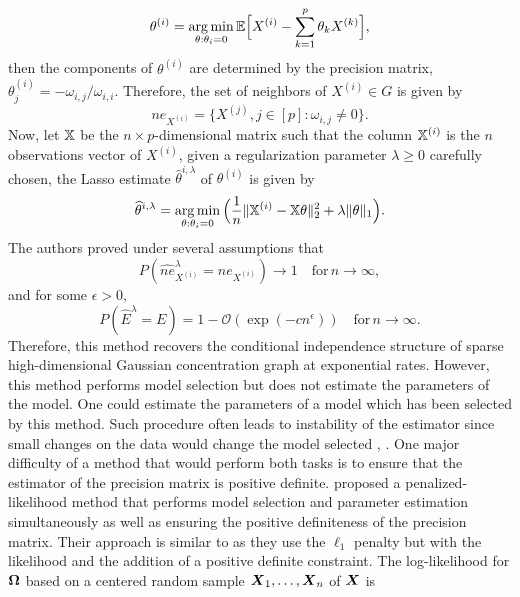 \begin{equation}
  \theta^{(i)} = \operatorname*{arg\,min}_{\theta:\theta_i=0}{\mathbb E}\Big[ X^{(i)}-\sum_{k=1}^p\theta_k X^{(k)}\Big],
\end{equation}
then the components of $\theta^{(i)}$ are determined by the precision matrix, $\theta^{(i)}_j=-\omega_{i,j}/\omega_{i,i}$. Therefore, the set of neighbors of $X^{(i)}\in G$ is given by
\begin{equation}
  ne_{X^{(i)}}= \{X^{(j)}, j\in[p]: \omega_{i,j} \neq 0 \}.
\end{equation}
Now, let ${\mathbb X}$ be the $n\times p$-dimensional matrix such that the column ${\mathbb X}^{(i)}$ is the $n$ observations vector of $X^{(i)}$, given a regularization parameter $\lambda \geq 0$ carefully chosen, the Lasso estimate $\hat\theta^{i,\lambda}$ of $\theta^{(i)}$ is given by
\begin{equation}
  \widehat\theta^{i,\lambda} = \operatorname*{arg\,min}_{\theta:\theta_i=0}\Big(\frac{1}{n}\|{\mathbb X}^{(i)}-{\mathbb X}\theta \|_2^2 + \lambda\|\theta\|_1 \Big).
\end{equation}
The authors proved under several assumptions that 
\begin{equation}
  P(\hat{ne}_{X^{(i)}}^{\lambda}=ne_{X^{(i)}})\rightarrow 1 \quad \text{for}\, n\rightarrow \infty,
\end{equation}
and for some $\epsilon > 0$,
\begin{equation}
  P(\hat E^{\lambda}=E)=1-\mathcal{O}(\exp(-cn^{\epsilon}))\quad \text{for}\, n\rightarrow \infty.
\end{equation}
Therefore, this method recovers the conditional independence structure of sparse high-dimensional Gaussian concentration graph  at exponential rates. However, this method performs model selection but does not estimate the parameters of the model. One  could estimate the parameters of a model which has been selected by this method. Such procedure often leads to instability of the estimator since small changes on the data would change the model selected \citep{yuanLin_graph}, \citep{breiman1996}. One major difficulty of a method that would perform both tasks is to ensure that the estimator of the precision matrix is positive definite. \citep{yuanLin_graph} proposed a penalized-likelihood method that performs model selection and parameter estimation simultaneously as well as ensuring the positive definiteness of the precision matrix. Their approach is similar to \citep{meinshausen2006} as they use the $\ell_1$ penalty but with the likelihood and the addition of a positive definite constraint. The log-likelihood for $\boldsymbol\Omega$ based on a  centered random sample $\boldsymbol X_1,\dots,\boldsymbol X_n$ of $\boldsymbol X$ is
